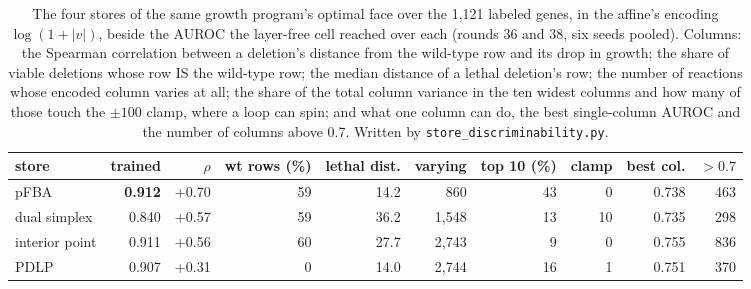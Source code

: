 \begin{table}[H]
  \centering
  \footnotesize
  \caption[What a head can read off each store]{The four stores of the same growth program's optimal face over the 1,121 labeled genes, in the affine's encoding $\log(1 + |v|)$, beside the AUROC the layer-free cell reached over each (rounds 36 and 38, six seeds pooled). Columns: the Spearman correlation between a deletion's distance from the wild-type row and its drop in growth; the share of viable deletions whose row IS the wild-type row; the median distance of a lethal deletion's row; the number of reactions whose encoded column varies at all; the share of the total column variance in the ten widest columns and how many of those touch the $\pm100$ clamp, where a loop can spin; and what one column can do, the best single-column AUROC and the number of columns above 0.7. Written by \texttt{store\_discriminability.py}.}
  \label{tab:store-discriminability}
  \begin{tabular}{@{}lrrrrrrrrr@{}}
    \hline
    store & trained & $\rho$ & wt rows (\%) & lethal dist. & varying & top 10 (\%) & clamp & best col. & $>0.7$ \\
    \hline
    pFBA & \textbf{0.912} & +0.70 & 59 & 14.2 & 860 & 43 & 0 & 0.738 & 463 \\
    dual simplex & 0.840 & +0.57 & 59 & 36.2 & 1,548 & 13 & 10 & 0.735 & 298 \\
    interior point & 0.911 & +0.56 & 60 & 27.7 & 2,743 & 9 & 0 & 0.755 & 836 \\
    PDLP & 0.907 & +0.31 & 0 & 14.0 & 2,744 & 16 & 1 & 0.751 & 370 \\
    \hline
  \end{tabular}
\end{table}
